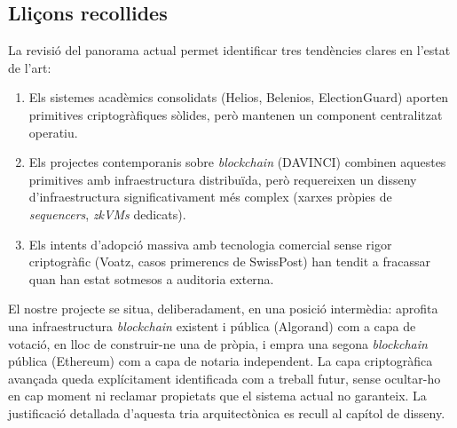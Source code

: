 \subsection{Lliçons recollides}
\label{subsec:llicons-recollides}

La revisió del panorama actual permet identificar tres tendències clares en l'estat de l'art:

\begin{enumerate}
    \item Els sistemes acadèmics consolidats (Helios, Belenios, ElectionGuard) aporten primitives criptogràfiques
    sòlides, però mantenen un component centralitzat operatiu.

    \item Els projectes contemporanis sobre \emph{blockchain} (DAVINCI) combinen aquestes primitives amb infraestructura
    distribuïda, però requereixen un disseny d'infraestructura significativament més complex (xarxes pròpies de
    \emph{sequencers}, \emph{zkVMs} dedicats).

    \item Els intents d'adopció massiva amb tecnologia comercial sense rigor criptogràfic (Voatz, casos primerencs de
    SwissPost) han tendit a fracassar quan han estat sotmesos a auditoria externa.
\end{enumerate}

El nostre projecte se situa, deliberadament, en una posició intermèdia: aprofita una infraestructura \emph{blockchain}
existent i pública (Algorand) com a capa de votació, en lloc de construir-ne una de pròpia, i empra una segona
\emph{blockchain} pública (Ethereum) com a capa de notaria independent.
La capa criptogràfica avançada queda explícitament identificada com a treball futur, sense ocultar-ho en cap moment ni
reclamar propietats que el sistema actual no garanteix.
La justificació detallada d'aquesta tria arquitectònica es recull al capítol de disseny.
